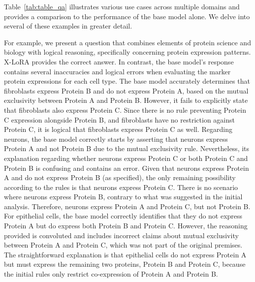 Table~\ref{tab:table_qa} illustrates various use cases across multiple domains and provides a comparison to the performance of the base model alone. We delve into several of these examples in greater detail.

For example, we present a question that combines elements of protein science and biology with logical reasoning, specifically concerning protein expression patterns. X-LoRA provides the correct answer. In contrast, the base model’s response contains several inaccuracies and logical errors when evaluating the marker protein expressions for each cell type. The base model accurately determines that fibroblasts express Protein B and do not express Protein A, based on the mutual exclusivity between Protein A and Protein B. However, it fails to explicitly state that fibroblasts also express Protein C. Since there is no rule preventing Protein C expression alongside Protein B, and fibroblasts have no restriction against Protein C, it is logical that fibroblasts express Protein C as well. Regarding neurons, the base model correctly starts by asserting that neurons express Protein A and not Protein B due to the mutual exclusivity rule. Nevertheless, its explanation regarding whether neurons express Protein C or both Protein C and Protein B is confusing and contains an error. Given that neurons express Protein A and do not express Protein B (as specified), the only remaining possibility according to the rules is that neurons express Protein C. There is no scenario where neurons express Protein B, contrary to what was suggested in the initial analysis. Therefore, neurons express Protein A and Protein C, but not Protein B. For epithelial cells, the base model correctly identifies that they do not express Protein A but do express both Protein B and Protein C. However, the reasoning provided is convoluted and includes incorrect claims about mutual exclusivity between Protein A and Protein C, which was not part of the original premises. The straightforward explanation is that epithelial cells do not express Protein A but must express the remaining two proteins, Protein B and Protein C, because the initial rules only restrict co-expression of Protein A and Protein B.

